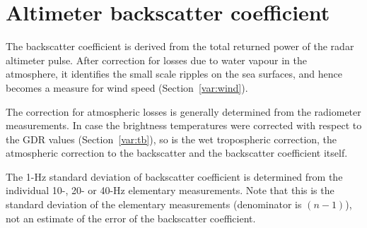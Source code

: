 \documentclass[a4paper,11pt,openany,natbib,nomargin]{thesis}
\begin{document}
\section{Altimeter backscatter coefficient}
\label{var:sig0}
The backscatter coefficient is derived from the total returned power of the radar altimeter pulse. After correction for losses due to water vapour in the atmosphere, it identifies the small scale ripples on the sea surfaces, and hence becomes a measure for wind speed (Section~\ref{var:wind}).

The correction for atmospheric losses is generally determined from the radiometer measurements. In case the brightness temperatures were corrected with respect to the GDR values (Section~\ref{var:tb}), so is the wet tropospheric correction, the atmospheric correction to the backscatter and the backscatter coefficient itself.

The 1-Hz standard deviation of backscatter coefficient is determined from the individual 10-, 20- or 40-Hz elementary measurements. Note that this is the standard deviation of the elementary measurements (denominator is $(n-1)$), not an estimate of the error of the backscatter coefficient.
\end{document}
